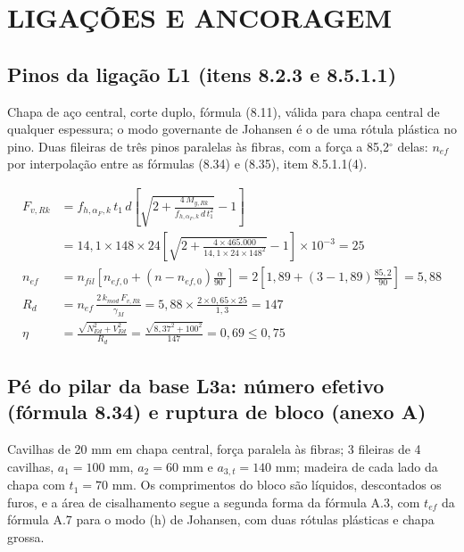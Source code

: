 \section{LIGAÇÕES E ANCORAGEM}\label{sec:mem-ligacoes}

\subsection*{Pinos da ligação L1 (itens 8.2.3 e 8.5.1.1)}

Chapa de aço central, corte duplo, fórmula (8.11), válida para chapa central de qualquer espessura; o modo governante de Johansen é o de uma rótula plástica no pino. Duas fileiras de três pinos paralelas às fibras, com a força a 85{,}2$^\circ$ delas: $n_{ef}$ por interpolação entre as fórmulas (8.34) e (8.35), item 8.5.1.1(4).

\begin{align}
    F_{v,Rk} &= f_{h,\alpha_F,k}\,t_1\,d\left[\sqrt{2 + \frac{4\,M_{y,Rk}}{f_{h,\alpha_F,k}\,d\,t_1^2}} - 1\right] \nonumber \\
    &= 14{,}1 \times 148 \times 24\left[\sqrt{2 + \frac{4 \times 465.000}{14{,}1 \times 24 \times 148^2}} - 1\right] \times 10^{-3} = 25 \nonumber \\
    n_{ef} &= n_{fil}\left[n_{ef,0} + (n - n_{ef,0})\frac{\alpha}{90^\circ}\right] = 2\left[1{,}89 + (3 - 1{,}89)\frac{85{,}2}{90}\right] = 5{,}88 \nonumber \\
    R_d &= n_{ef}\,\frac{2\,k_{mod}\,F_{v,Rk}}{\gamma_M} = 5{,}88 \times \frac{2 \times 0{,}65 \times 25}{1{,}3} = 147 \nonumber \\
    \eta &= \frac{\sqrt{N_{Ed}^2 + V_{Ed}^2}}{R_d} = \frac{\sqrt{8{,}37^2 + 100^2}}{147} = 0{,}69 \leq 0{,}75
    \label{eq:mem-l1}
\end{align}
\subsection*{Pé do pilar da base L3a: número efetivo (fórmula 8.34) e ruptura de bloco (anexo A)}

Cavilhas de 20 mm em chapa central, força paralela às fibras; 3 fileiras de 4 cavilhas, $a_1 = 100$ mm, $a_2 = 60$ mm e $a_{3,t} = 140$ mm; madeira de cada lado da chapa com $t_1 = 70$ mm. Os comprimentos do bloco são líquidos, descontados os furos, e a área de cisalhamento segue a segunda forma da fórmula A.3, com $t_{ef}$ da fórmula A.7 para o modo (h) de Johansen, com duas rótulas plásticas e chapa grossa.

